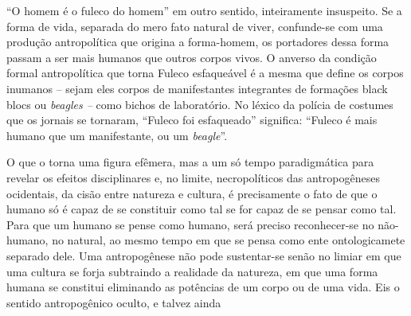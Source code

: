 ``O homem é o fuleco do homem'' em outro sentido, inteiramente
insuspeito. Se a forma de vida, separada do mero fato natural de viver,
confunde-se com uma produção antropolítica que origina a forma-homem, os
portadores dessa forma passam a ser mais humanos que outros corpos
vivos. O anverso da condição formal antropolítica que torna Fuleco
esfaqueável é a mesma que define os corpos inumanos -- sejam eles corpos
de manifestantes integrantes de formações black blocs ou \emph{beagles
--} como bichos de laboratório. No léxico da polícia de costumes que os
jornais se tornaram, ``Fuleco foi esfaqueado'' significa: ``Fuleco é
mais humano que um manifestante, ou um \emph{beagle}''.

O que o torna uma figura efêmera, mas a um só tempo paradigmática para
revelar os efeitos disciplinares e, no limite, necropolíticos das
antropogêneses ocidentais, da cisão entre natureza e cultura, é
precisamente o fato de que o humano só é capaz de se constituir como tal
se for capaz de se pensar como tal. Para que um humano se pense como
humano, será preciso reconhecer-se no não-humano, no natural, ao mesmo
tempo em que se pensa como ente ontologicamete separado dele. Uma
antropogênese não pode sustentar-se senão no limiar em que uma cultura
se forja subtraindo a realidade da natureza, em que uma forma humana se
constitui eliminando as potências de um corpo ou de uma vida. Eis o
sentido antropogênico oculto, e talvez ainda
